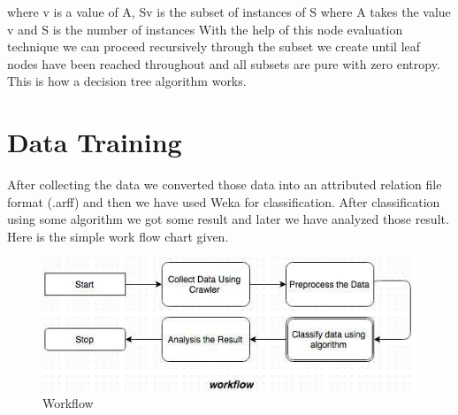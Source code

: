 where v is a value of A, Sv is the subset of instances of S where A takes the value v and S is the number of instances With the help of this node evaluation technique we can proceed recursively through the subset we create until leaf nodes have been reached throughout and all subsets are pure with zero entropy. This is how a decision tree algorithm works.

\section{Data Training}
After collecting the data we converted those data into an attributed relation file format (.arff) and then we have used Weka for classification. After classification using some algorithm we got some result and later we have analyzed those result. Here is the simple work flow chart given. 

\begin{figure}[ht]
\centering
\includegraphics[scale=0.5]{images/fig-5.jpg}
\caption{Workflow}
\label{fig:x Workflow}
\end{figure}


